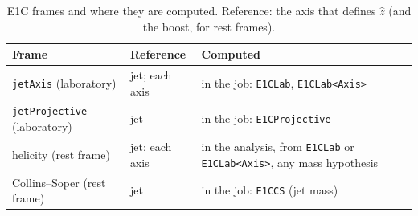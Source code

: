 \documentclass[11pt]{article}
\newcommand{\code}[1]{\texttt{#1}}
\begin{document}
\begin{table}[htbp]
\centering
\caption{E1C frames and where they are computed. Reference: the axis that defines $\hat z$ (and the boost, for rest
frames).}
\label{tab:e1cframes}
\small
\begin{tabularx}{\textwidth}{>{\raggedright\arraybackslash}p{3.3cm}>{\raggedright\arraybackslash}p{2.7cm}>{\raggedright\arraybackslash}X}
\toprule
Frame & Reference & Computed \\
\midrule
\code{jetAxis} (laboratory) & jet; each axis & in the job: \code{E1CLab}, \code{E1CLab<Axis>} \\
\code{jetProjective} (laboratory) & jet & in the job: \code{E1CProjective} \\
helicity (rest frame) & jet; each axis & in the analysis, from \code{E1CLab} or \code{E1CLab<Axis>}, any mass hypothesis \\
Collins--Soper (rest frame) & jet & in the job: \code{E1CCS} (jet mass) \\
\bottomrule
\end{tabularx}
\end{table}
\end{document}
